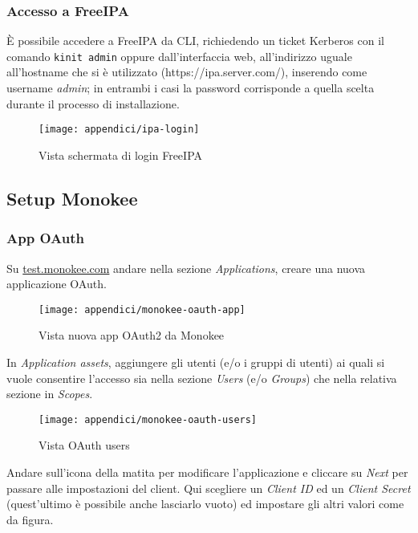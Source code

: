 \hypertarget{accesso-a-freeipa}{%
\subsubsection{Accesso a FreeIPA}\label{accesso-a-freeipa}}

È possibile accedere a FreeIPA da CLI, richiedendo un ticket Kerberos
con il comando \texttt{kinit\ admin} oppure dall'interfaccia web,
all'indirizzo uguale all'hostname che si è utilizzato
(https://ipa.server.com/), inserendo come username \emph{admin}; in
entrambi i casi la password corrisponde a quella scelta durante il
processo di installazione.

\begin{figure}[!h] 
  \centering 
  \texttt{[image: appendici/ipa-login]} 
  \caption{Vista schermata di login FreeIPA}
\end{figure}

\hypertarget{setup-monokee}{%
\subsection{Setup Monokee}\label{setup-monokee}}

\hypertarget{app-oauth}{%
\subsubsection{App OAuth}\label{app-oauth}}

Su \url{test.monokee.com} andare nella sezione \emph{Applications},
creare una nuova applicazione OAuth.

\begin{figure}[!h] 
  \centering 
  \texttt{[image: appendici/monokee-oauth-app]} 
  \caption{Vista nuova app OAuth2 da Monokee}
\end{figure}


In \emph{Application assets}, aggiungere gli utenti (e/o i gruppi di
utenti) ai quali si vuole consentire l'accesso sia nella sezione
\emph{Users} (e/o \emph{Groups}) che nella relativa sezione in
\emph{Scopes}.

\begin{figure}[!h] 
  \centering 
  \texttt{[image: appendici/monokee-oauth-users]} 
  \caption{Vista OAuth users}
\end{figure}


Andare sull'icona della matita per modificare l'applicazione e cliccare
su \emph{Next} per passare alle impostazioni del client. Qui scegliere
un \emph{Client ID} ed un \emph{Client Secret} (quest'ultimo è possibile
anche lasciarlo vuoto) ed impostare gli altri valori come da figura.

